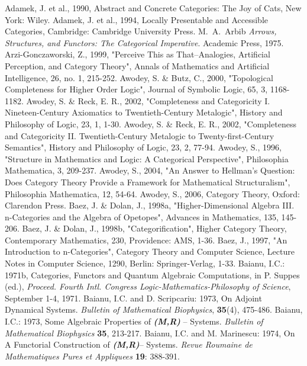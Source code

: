 \documentclass[12pt]{article}
\begin{document}
\begin{thebibliography}{199}
Adamek, J. et al., 1990, Abstract and Concrete Categories: The Joy of Cats, New York: Wiley. 
Adamek, J. et al., 1994, Locally Presentable and Accessible Categories, Cambridge: Cambridge University Press.
M.~A.~Arbib {\em Arrows, Structures, and Functors: The Categorical Imperative}.
Academic Press, 1975.
Arzi-Gonczaworski, Z., 1999, "Perceive This as That--Analogies, Artificial Perception, and Category Theory", Annals of Mathematics and Artificial Intelligence, 26, no. 1, 215-252.
Awodey, S. \& Butz, C., 2000, "Topological Completeness for Higher Order Logic", Journal of Symbolic Logic, 65, 3, 
1168-1182. 
Awodey, S. \& Reck, E. R., 2002, "Completeness and Categoricity I. Nineteen-Century Axiomatics to Twentieth-Century Metalogic", History and Philosophy of Logic, 23, 1, 1-30.
Awodey, S. \& Reck, E. R., 2002, "Completeness and Categoricity II. Twentieth-Century Metalogic to Twenty-first-Century Semantics", History and Philosophy of Logic, 23, 2, 77-94.  
Awodey, S., 1996, "Structure in Mathematics and Logic: A Categorical Perspective", Philosophia Mathematica, 3, 209-237. 
Awodey, S., 2004, "An Answer to Hellman's Question: Does Category Theory Provide a Framework for Mathematical Structuralism", Philosophia Mathematica, 12, 54-64.
Awodey, S., 2006, Category Theory, Oxford: Clarendon Press.
Baez, J. \& Dolan, J., 1998a, "Higher-Dimensional Algebra III. n-Categories and the Algebra of Opetopes", Advances in Mathematics, 135, 145-206.
Baez, J. \& Dolan, J., 1998b, "Categorification", Higher Category Theory, Contemporary Mathematics, 230, Providence: AMS, 1-36.
Baez, J., 1997, "An Introduction to n-Categories", Category Theory and Computer Science, Lecture Notes in Computer Science, 1290, Berlin: Springer-Verlag, 1-33.
Baianu, I.C.: 1971b, Categories, Functors and Quantum Algebraic
Computations, in P. Suppes (ed.), \emph{Proceed. Fourth Intl. Congress Logic-Mathematics-Philosophy of Science}, September 1-4, 1971.
Baianu, I.C. and D. Scripcariu: 1973, On Adjoint Dynamical Systems. \emph{Bulletin of Mathematical Biophysics}, \textbf{35}(4), 475-486.
Baianu, I.C.: 1973, Some Algebraic Properties of \emph{\textbf{(M,R)}} -- Systems. \emph{Bulletin of Mathematical Biophysics} \textbf{35}, 213-217.
Baianu, I.C. and M. Marinescu: 1974, On A Functorial Construction of \emph{\textbf{(M,R)}}-- Systems. \emph{Revue Roumaine de Mathematiques Pures et Appliquees} \textbf{19}: 388-391.

\end{thebibliography}
\end{document}
